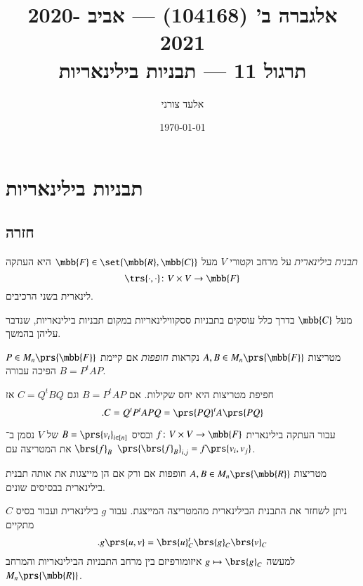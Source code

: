 \documentclass[a4paper,10pt,oneside,openany]{article}
\title{
אלגברה ב' (104168) \textenglish{---} אביב 2020-2021
\\
תרגול 11 \textenglish{---}
תבניות בילינאריות
}
\author{אלעד צורני}
\date{\today}
\begin{document}
\maketitle

\section{תבניות בילינאריות}

\subsection{חזרה}

\begin{definition}
\emph{תבנית בילינארית}
על מרחב וקטורי
$V$
מעל
$\mbb{F} \in \set{\mbb{R}, \mbb{C}}$
היא העתקה
\[\trs{\cdot,\cdot} \colon V \times V \to \mbb{F}\]
לינארית בשני הרכיבים.
\end{definition}

\begin{remark}
מעל
$\mbb{C}$
בדרך כלל עוסקים בתבניות ססקווילינאריות במקום תבניות בילינאריות, שנדבר עליהן בהמשך.
\end{remark}

\begin{definition}
מטריצות
$A,B \in M_n\prs{\mbb{F}}$
נקראות
\emph{חופפות}
אם קיימת
$P \in M_n\prs{\mbb{F}}$
הפיכה
עבורה
$B = P^t A P$.
\end{definition}

\begin{remark}
חפיפת מטריצות היא יחס שקילות.
אם
$B = P^t A P$
וגם
$C = Q^t B Q$
אז
\[\text{.} C = Q^t P^t A P Q = \prs{PQ}^t A \prs{PQ}\]
\end{remark}

\begin{definition}
עבור העתקה בילינארית
$f \colon V \times V \to \mbb{F}$
ובסיס
$B = \prs{v_i}_{i \in [n]}$
של
$V$
נסמן ב־%
$\brs{f}_B$
את המטריצה עם
$\prs{\brs{f}_B}_{i,j} = f\prs{v_i, v_j}$.
\end{definition}

\begin{remark}
מטריצות
$A,B \in M_n\prs{\mbb{R}}$
חופפות אם ורק אם הן מייצגות את אותה תבנית בילינארית בבסיסים שונים.
\end{remark}

\begin{remark}
ניתן לשחזר את התבנית הבילינארית מהמטריצה המייצגת. עבור
$g$
בילינארית ועבור בסיס
$C$
מתקיים
\[\text{.} g\prs{u,v} = \brs{u}_C^t \brs{g}_C \brs{v}_C\]
למעשה
$g \mapsto \brs{g}_C$
איזומורפיזם בין מרחב התבניות הבילינאריות והמרחב
$M_n\prs{\mbb{R}}$.
\end{remark}
\end{document}
